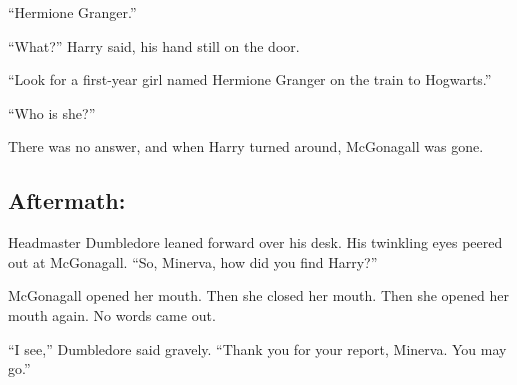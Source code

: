 “Hermione Granger.”

“What?” Harry said, his hand still on the door.

“Look for a first-year girl named Hermione Granger on the train to Hogwarts.”

“Who is she?”

There was no answer, and when Harry turned around, McGonagall was gone.
\replacement{\sbreak}{}

\subsection{Aftermath:}

Headmaster Dumbledore leaned forward over his desk. His twinkling eyes peered out at McGonagall. “So, Minerva, how did you find Harry?”

McGonagall opened her mouth. Then she closed her mouth. Then she opened her mouth again. No words came out.

“I see,” Dumbledore said gravely. “Thank you for your report, Minerva. You may go.”


